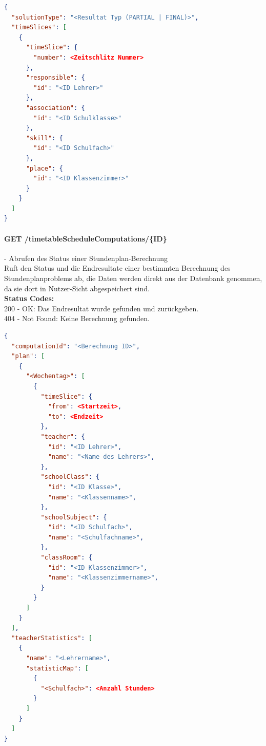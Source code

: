\begin{lstlisting}[language=JSON, caption=Beispiel eines Resultates für das Stundenplanproblem aus Algorithmus-Sicht, label=lst:solution_timetableScheduling_algo]  
{
  "solutionType": "<Resultat Typ (PARTIAL | FINAL)>",
  "timeSlices": [
    {
      "timeSlice": {
        "number": <Zeitschlitz Nummer>
      },
      "responsible": {
        "id": "<ID Lehrer>"
      },
      "association": {
        "id": "<ID Schulklasse>"
      },
      "skill": {
        "id": "<ID Schulfach>"
      },
      "place": {
        "id": "<ID Klassenzimmer>"
      }
    }
  ]
}
\end{lstlisting}

\paragraph{GET /timetableScheduleComputations/\{ID\}} - Abrufen des Status einer Stundenplan-Berechnung\mbox{}\\
Ruft den Status und die Endresultate einer bestimmten Berechnung des Stundenplanproblems ab, die Daten werden direkt aus der Datenbank genommen, da sie dort in Nutzer-Sicht abgespeichert sind.\\
\textbf{Status Codes:}\\
200 - OK: Das Endresultat wurde gefunden und zurückgeben.\\
404 - Not Found: Keine Berechnung gefunden.\\

\begin{lstlisting}[language=JSON, caption=Beispiel eines Endresultates für das Stundenplanproblem, label=lst:solution_timetableScheduling]  
{
  "computationId": "<Berechnung ID>",
  "plan": [
    {
      "<Wochentag>": [
        {
          "timeSlice": {
            "from": <Startzeit>,
            "to": <Endzeit>
          },
          "teacher": {
            "id": "<ID Lehrer>",
            "name": "<Name des Lehrers>",
          },
          "schoolClass": {
            "id": "<ID Klasse>",
            "name": "<Klassenname>",
          },
          "schoolSubject": {
            "id": "<ID Schulfach>",
            "name": "<Schulfachname>",
          },
          "classRoom": {
            "id": "<ID Klassenzimmer>",
            "name": "<Klassenzimmername>",
          }
        }
      ]
    }
  ],
  "teacherStatistics": [
    {
      "name": "<Lehrername>",
      "statisticMap": [
        {
          "<Schulfach>": <Anzahl Stunden>
        }
      ]
    }
  ]
}
\end{lstlisting}

